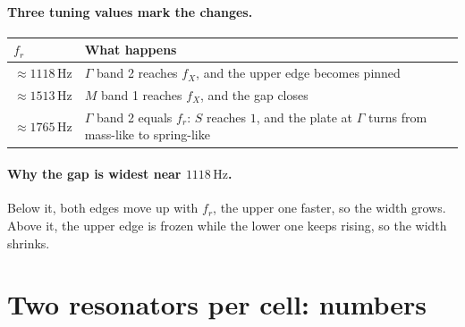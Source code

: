 \paragraph{Three tuning values mark the changes.}
\begin{center}
\begin{tabular}{|l|p{}|}
\hline
$f_r$ & What happens \\
\hline
$\approx 1118\,\mathrm{Hz}$ & $\Gamma$ band 2 reaches $f_X$, and the upper edge becomes pinned \\
$\approx 1513\,\mathrm{Hz}$ & $M$ band 1 reaches $f_X$, and the gap closes \\
$\approx 1765\,\mathrm{Hz}$ & $\Gamma$ band 2 equals $f_r$: $S$ reaches $1$, and the plate at $\Gamma$ turns from mass-like to spring-like \\
\hline
\end{tabular}
\end{center}
\paragraph{Why the gap is widest near $1118\,\mathrm{Hz}$.}
Below it, both edges move up with $f_r$, the upper one faster, so the width
grows. Above it, the upper edge is frozen while the lower one keeps rising, so
the width shrinks.

\section{Two resonators per cell: numbers}
\label{sec:two_resonators}


